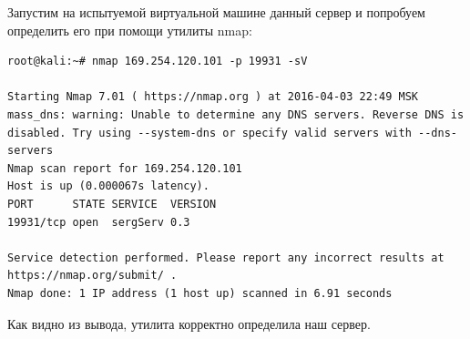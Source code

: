 \documentclass[10pt,a4paper]{report}
\begin{document}
		Запустим на испытуемой виртуальной машине данный сервер и попробуем определить его при помощи утилиты nmap:
		\begin{verbatim}
root@kali:~# nmap 169.254.120.101 -p 19931 -sV

Starting Nmap 7.01 ( https://nmap.org ) at 2016-04-03 22:49 MSK
mass_dns: warning: Unable to determine any DNS servers. Reverse DNS is disabled. Try using --system-dns or specify valid servers with --dns-servers
Nmap scan report for 169.254.120.101
Host is up (0.000067s latency).
PORT      STATE SERVICE  VERSION
19931/tcp open  sergServ 0.3

Service detection performed. Please report any incorrect results at https://nmap.org/submit/ .
Nmap done: 1 IP address (1 host up) scanned in 6.91 seconds

		\end{verbatim}
		Как видно из вывода, утилита корректно определила наш сервер.
		
\end{document}
